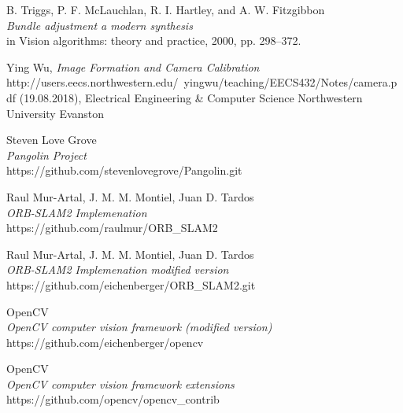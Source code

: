 \documentclass[11pt,a4paper,titlepage,oneside]{report}
\begin{document}
\begin{thebibliography}{1}
	B. Triggs, P. F. McLauchlan, R. I. Hartley, and A. W. Fitzgibbon\\
	\textit{Bundle adjustment a modern synthesis}\\
 	in Vision algorithms: theory and practice, 2000, pp. 298–372. 

	Ying Wu,
	\textit{Image Formation and Camera Calibration}
	http://users.eecs.northwestern.edu/~yingwu/teaching/EECS432/Notes/camera.pdf (19.08.2018), Electrical Engineering \& Computer Science Northwestern University Evanston

	Steven Love Grove\\
	\textit{Pangolin Project}\\
	https://github.com/stevenlovegrove/Pangolin.git

  Raul Mur-Artal, J. M. M. Montiel, Juan D. Tardos\\
  \textit{ORB-SLAM2 Implemenation}\\
	https://github.com/raulmur/ORB\_SLAM2

  Raul Mur-Artal, J. M. M. Montiel, Juan D. Tardos\\
  \textit{ORB-SLAM2 Implemenation modified version}\\
	https://github.com/eichenberger/ORB\_SLAM2.git

	OpenCV\\
	\textit{OpenCV computer vision framework (modified version)}\\
	https://github.com/eichenberger/opencv

	OpenCV\\
	\textit{OpenCV computer vision framework extensions}\\
	https://github.com/opencv/opencv\_contrib

\end{thebibliography}
\end{document}
